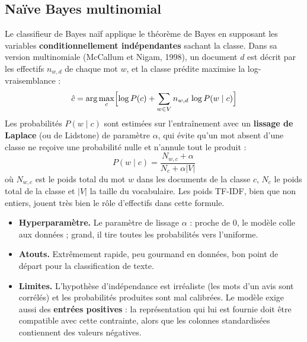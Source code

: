 \documentclass[11pt,a4paper]{report}
\numberwithin{equation}{chapter}
\begin{document}
\subsection{Naïve Bayes multinomial}
Le classifieur de Bayes naïf applique le théorème de Bayes en supposant les variables \textbf{conditionnellement indépendantes} sachant la classe. Dans sa version multinomiale (McCallum et Nigam, 1998), un document $d$ est décrit par les effectifs $n_{w,d}$ de chaque mot $w$, et la classe prédite maximise la log-vraisemblance :
\begin{equation}\label{eq:nb}
\hat{c} = \arg\max_{c}\Bigl[\log P(c) + \sum_{w\in V} n_{w,d}\,\log P(w\mid c)\Bigr]
\end{equation}
Les probabilités $P(w \mid c)$ sont estimées sur l'entraînement avec un \textbf{lissage de Laplace} (ou de Lidstone) de paramètre $\alpha$, qui évite qu'un mot absent d'une classe ne reçoive une probabilité nulle et n'annule tout le produit :
\begin{equation}\label{eq:laplace}
P(w\mid c) = \frac{N_{w,c} + \alpha}{N_c + \alpha\lvert V\rvert}
\end{equation}
où $N_{w,c}$ est le poids total du mot $w$ dans les documents de la classe $c$, $N_c$ le poids total de la classe et $\lvert V\rvert$ la taille du vocabulaire. Les poids TF-IDF, bien que non entiers, jouent très bien le rôle d'effectifs dans cette formule.
\begin{itemize}
\item \textbf{Hyperparamètre.} Le paramètre de lissage $\alpha$ : proche de 0, le modèle colle aux données ; grand, il tire toutes les probabilités vers l'uniforme.
\item \textbf{Atouts.} Extrêmement rapide, peu gourmand en données, bon point de départ pour la classification de texte.
\item \textbf{Limites.} L'hypothèse d'indépendance est irréaliste (les mots d'un avis sont corrélés) et les probabilités produites sont mal calibrées. Le modèle exige aussi des \textbf{entrées positives} : la représentation qui lui est fournie doit être compatible avec cette contrainte, alors que les colonnes standardisées contiennent des valeurs négatives.
\end{itemize}
\end{document}
